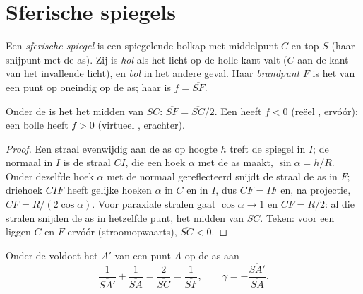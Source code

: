 \section{Sferische spiegels}

\begin{definition}\label{def:b1:mirrors-thin-lenses:mirror}
Een \emph{sferische spiegel} is een spiegelende bolkap met middelpunt $C$
en top $S$ (haar snijpunt met de as). Zij is \emph{hol} als het licht op de
holle kant valt ($C$ aan de kant van het invallende licht), en \emph{bol}
in het andere geval. Haar \emph{brandpunt} $F$ is het  van een punt op
oneindig op de as; haar  is $f = \overline{SF}$.
\end{definition}

\begin{proposition}\label{prop:b1:mirrors-thin-lenses:focus}
Onder de  is het  het midden van $SC$:
$\overline{SF} = \overline{SC}/2$. Een  heeft $f < 0$ (reëel
, ervóór); een bolle heeft $f > 0$ (virtueel , erachter).
\end{proposition}

\begin{proof}
Een straal evenwijdig aan de as op hoogte $h$ treft de spiegel in $I$; de
normaal in $I$ is de straal $CI$, die een hoek $\alpha$ met de as maakt,
$\sin\alpha = h/R$. Onder dezelfde hoek $\alpha$ met de normaal
gereflecteerd snijdt de straal de as in $F$; driehoek $CIF$ heeft gelijke
hoeken $\alpha$ in $C$ en in $I$, dus $CF = IF$ en, na projectie,
$CF = R/(2\cos\alpha)$. Voor paraxiale stralen gaat $\cos\alpha \to 1$ en
$CF = R/2$: al die stralen snijden de as in hetzelfde punt, het
midden van $SC$. Teken: voor een  liggen $C$ en $F$ ervóór
(stroomopwaarts), $\overline{SC} < 0$.
\end{proof}

\begin{theorem}\label{thm:b1:mirrors-thin-lenses:mirrorconj}
Onder de  voldoet het  $A'$ van een punt $A$ op de
as aan
\[
\frac{1}{\overline{SA'}} + \frac{1}{\overline{SA}} = \frac{2}{\overline{SC}}
= \frac{1}{\overline{SF}},
\qquad
\gamma = -\frac{\overline{SA'}}{\overline{SA}} .
\]
\end{theorem}

